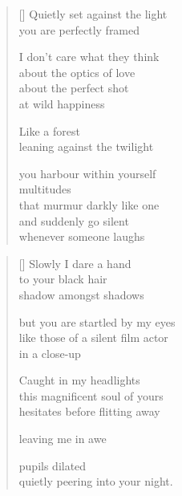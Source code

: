 \documentclass[14pt]{extbook}
\newcommand*{\centeredornament}{\centerline{\pgfornament[width=6cm]{88}}}
\begin{document}

\newpage

\vspace*{-15mm}
\centeredornament
\vspace*{-7mm}


\settowidth{\versewidth}{that murmur darkly like one}

\begin{verse}[\versewidth]
  Quietly set against the light \\
  you are perfectly framed

  I don't care what they think \\
  about the optics of love \\
  about the perfect shot \\
  at wild happiness

  Like a forest \\
  leaning against the twilight

  you harbour within yourself \\
  multitudes \\
  that murmur darkly like one \\
  and suddenly go silent \\
  whenever someone laughs
\end{verse}

\newpage

\settowidth{\versewidth}{but you are startled by my eyes}

\begin{verse}[\versewidth]
  Slowly I dare a hand \\
  to your black hair \\
  shadow amongst shadows

  but you are startled by my eyes \\
  like those of a silent film actor \\
  in a close-up

  Caught in my headlights \\
  this magnificent soul of yours \\
  hesitates before flitting away

  leaving me in awe

  pupils dilated \\
  quietly peering into your night.
\end{verse}

\end{document}
